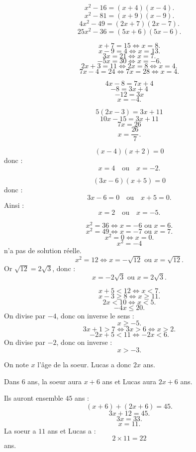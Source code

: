 \documentclass[11pt,a4paper]{article}
\newcounter{correction}
\begin{document}
\begin{correction}
\[
x^2-16=(x+4)(x-4).
\]
\[
x^2-81=(x+9)(x-9).
\]
\[
4x^2-49=(2x+7)(2x-7).
\]
\[
25x^2-36=(5x+6)(5x-6).
\]
\end{correction}

\begin{correction}
\[
x+7=15 \Longleftrightarrow x=8.
\]
\[
x-9=4 \Longleftrightarrow x=13.
\]
\[
3x=21 \Longleftrightarrow x=7.
\]
\[
-5x=30 \Longleftrightarrow x=-6.
\]
\[
2x+3=11 \Longleftrightarrow 2x=8 \Longleftrightarrow x=4.
\]
\[
7x-4=24 \Longleftrightarrow 7x=28 \Longleftrightarrow x=4.
\]
\end{correction}

\begin{correction}
\[
4x-8=7x+4
\]
\[
-8=3x+4
\]
\[
-12=3x
\]
\[
x=-4.
\]

\[
5(2x-3)=3x+11
\]
\[
10x-15=3x+11
\]
\[
7x=26
\]
\[
x=\frac{26}{7}.
\]
\end{correction}

\begin{correction}
\[
(x-4)(x+2)=0
\]
donc :
\[
x=4 \quad \text{ou} \quad x=-2.
\]

\[
(3x-6)(x+5)=0
\]
donc :
\[
3x-6=0 \quad \text{ou} \quad x+5=0.
\]
Ainsi :
\[
x=2 \quad \text{ou} \quad x=-5.
\]
\end{correction}

\begin{correction}[Équations $x^2=a$]
\[
x^2=36 \Longleftrightarrow x=-6 \text{ ou } x=6.
\]
\[
x^2=49 \Longleftrightarrow x=-7 \text{ ou } x=7.
\]
\[
x^2=0 \Longleftrightarrow x=0.
\]
\[
x^2=-4
\]
n'a pas de solution réelle.
\[
x^2=12 \Longleftrightarrow x=-\sqrt{12} \text{ ou } x=\sqrt{12}.
\]
Or $\sqrt{12}=2\sqrt3$, donc :
\[
x=-2\sqrt3 \text{ ou } x=2\sqrt3.
\]
\end{correction}

\begin{correction}[Inéquations]
\[
x+5<12 \Longleftrightarrow x<7.
\]
\[
x-3\geq8 \Longleftrightarrow x\geq11.
\]
\[
2x<10 \Longleftrightarrow x<5.
\]
\[
-4x\leq20.
\]
On divise par $-4$, donc on inverse le sens :
\[
x\geq -5.
\]
\[
3x+1>7 \Longleftrightarrow 3x>6 \Longleftrightarrow x>2.
\]
\[
-2x+5<11 \Longleftrightarrow -2x<6.
\]
On divise par $-2$, donc on inverse :
\[
x>-3.
\]
\end{correction}

\begin{correction}
On note $x$ l'âge de la soeur. Lucas a donc $2x$ ans.

Dans $6$ ans, la soeur aura $x+6$ ans et Lucas aura $2x+6$ ans.

Ils auront ensemble $45$ ans :
\[
(x+6)+(2x+6)=45.
\]
\[
3x+12=45.
\]
\[
3x=33.
\]
\[
x=11.
\]
La soeur a $11$ ans et Lucas a :
\[
2\times11=22
\]
ans.
\end{correction}
\end{document}
